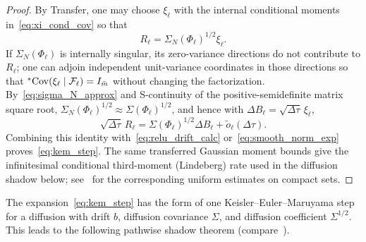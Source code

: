 \begin{proof}
By Transfer, one may choose $\xi_\ell$ with the internal conditional moments in~\eqref{eq:xi_cond_cov} so that
\begin{equation}\label{eq:R_sqrt_factor}
R_\ell = \Sigma_N(\Phi_\ell)^{1/2}\xi_\ell.
\end{equation}
If $\Sigma_N(\Phi_\ell)$ is internally singular, its zero-variance directions do not contribute to $R_\ell$; one can adjoin independent unit-variance coordinates in those directions so that ${}^*\!\operatorname{Cov}(\xi_\ell \mid \mathcal{F}_\ell) = I_{\bar{m}}$ without changing the factorization. By~\eqref{eq:sigma_N_approx} and S-continuity of the positive-semidefinite matrix square root, $\Sigma_N(\Phi_\ell)^{1/2} \approx \Sigma(\Phi_\ell)^{1/2}$, and hence with $\Delta B_\ell = \sqrt{\Delta\tau}\,\xi_\ell$,
\begin{equation}\label{eq:sqrt_swap_remainder}
\sqrt{\Delta\tau}\,R_\ell = \Sigma(\Phi_\ell)^{1/2}\Delta B_\ell + \tilde{o}_\ell(\Delta\tau).
\end{equation}
Combining this identity with~\eqref{eq:relu_drift_calc} or~\eqref{eq:smooth_norm_exp} proves~\eqref{eq:kem_step}. The same transferred Gaussian moment bounds give the infinitesimal conditional third-moment (Lindeberg) rate used in the diffusion shadow below; see~\cite[Appendices~C--D]{li2022neural} for the corresponding uniform estimates on compact sets.
\end{proof}

The expansion~\eqref{eq:kem_step} has the form of one Keisler--Euler--Maruyama step for a diffusion with drift $b$, diffusion covariance $\Sigma$, and diffusion coefficient $\Sigma^{1/2}$. This leads to the following pathwise shadow theorem (compare~\cite{li2022neural}).

